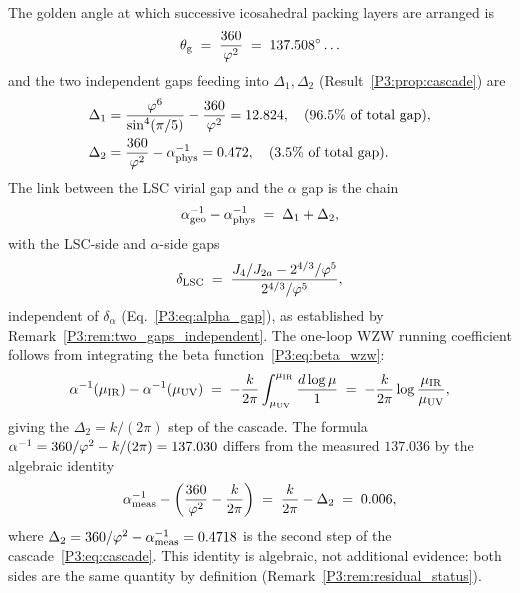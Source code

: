 The golden angle at which successive icosahedral packing layers are
arranged is
\begin{equation}
  \theta_{\mathrm{g}} \;=\; \frac{360}{\varphi^2} \;=\; 137.508^\circ\ldots
  \label{P3:eq:golden_angle}
\end{equation}
and the two independent gaps feeding into $\Delta_1,\Delta_2$
(Result~\ref{P3:prop:cascade}) are
\begin{align}
  \Delta_1 &= \frac{\varphi^6}{\sin^4(\pi/5)} - \frac{360}{\varphi^2}
           = 12.824,
  \quad (96.5\%\text{ of total gap}),
  \label{P3:eq:delta1}\\
  \Delta_2 &= \frac{360}{\varphi^2} - \alpha^{-1}_{\mathrm{phys}}
           = 0.472,
  \quad (3.5\%\text{ of total gap}).
  \label{P3:eq:delta2}
\end{align}
The link between the LSC virial gap and the $\alpha$ gap is the chain
\begin{equation}
  \alpha^{-1}_{\mathrm{geo}} - \alpha^{-1}_{\mathrm{phys}}
  \;=\; \Delta_1 + \Delta_2,
  \label{P3:eq:chain_full}
\end{equation}
with the LSC-side and $\alpha$-side gaps
\begin{equation}
  \delta_{\mathrm{LSC}} \;=\; \frac{J_4/J_{2a} - 2^{4/3}/\varphi^5}{2^{4/3}/\varphi^5},
  \label{P3:eq:lsc_gap}
\end{equation}
independent of $\delta_\alpha$ (Eq.~\eqref{P3:eq:alpha_gap}), as
established by Remark~\ref{P3:rem:two_gaps_independent}.
The one-loop WZW running coefficient follows from integrating the beta
function~\eqref{P3:eq:beta_wzw}:
\begin{equation}
  \alpha^{-1}(\mu_{\mathrm{IR}}) - \alpha^{-1}(\mu_{\mathrm{UV}})
  \;=\; -\frac{k}{2\pi}\int_{\mu_{\mathrm{UV}}}^{\mu_{\mathrm{IR}}}\frac{d\log\mu}{1}
  \;=\; -\frac{k}{2\pi}\log\frac{\mu_{\mathrm{IR}}}{\mu_{\mathrm{UV}}},
  \label{P3:eq:running_integral}
\end{equation}
giving the $\Delta_2 = k/(2\pi)$ step of the cascade. The formula
$\alpha^{-1} = 360/\varphi^2 - k/(2\pi) = 137.030$ differs from the measured
$137.036$ by the algebraic identity
\begin{equation}
  \alpha^{-1}_{\mathrm{meas}} - \left(\frac{360}{\varphi^2} - \frac{k}{2\pi}\right)
  \;=\; \frac{k}{2\pi} - \Delta_2
  \;=\; 0.006,
  \label{P3:eq:residual_identity}
\end{equation}
where $\Delta_2 = 360/\varphi^2 - \alpha^{-1}_{\mathrm{meas}} = 0.4718$ is the
second step of the cascade~\eqref{P3:eq:cascade}. This identity is
algebraic, not additional evidence: both sides are the same quantity
by definition (Remark~\ref{P3:rem:residual_status}).

